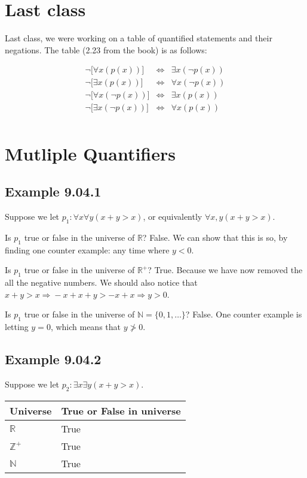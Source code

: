 \documentclass{article}
\begin{document}
\section*{Last class}

Last class, we were working on a table of quantified statements and
their negations. The table (2.23 from the book) is as follows:

\[
\begin{array}{rcl}
\neg\lbrack\forall x(p(x))\rbrack & \Leftrightarrow & \exists x(\neg p(x)) \\
\neg\lbrack\exists x(p(x))\rbrack & \Leftrightarrow & \forall x(\neg p(x)) \\
\neg\lbrack\forall x(\neg p(x))\rbrack & \Leftrightarrow & \exists x(p(x)) \\
\neg\lbrack\exists x(\neg p(x))\rbrack & \Leftrightarrow & \forall x(p(x)) \\
\end{array}
\]

\section*{Mutliple Quantifiers}

\subsection*{Example 9.04.1}

Suppose we let $p_1:\forall{}x\forall{}y(x+y>x)$, or equivalently
$\forall{}x,y(x+y>x)$.

Is $p_1$ true or false in the universe of $\mathbb{R}$? False. We can
show that this is so, by finding one counter example: any time where
$y<0$.

Is $p_1$ true or false in the universe of $\mathbb{R}^+$?
True. Because we have now removed the all the negative numbers. We
should also notice that
$x+y>x\Rightarrow{}-x+x+y>-x+x\Rightarrow{}y>0$.

Is $p_1$ true or false in the universe of $\mathbb{N}=\{0,1,\dots\}$?
False. One counter example is letting $y=0$, which means that
$y\not>0$.

\subsection*{Example 9.04.2}

Suppose we let $p_2:\exists{}x\exists{}y(x+y>x)$.

\begin{tabular}{ll}
Universe & True or False in universe \\
\hline
$\mathbb{R}$ & True \\
$\mathbb{Z}^+$ & True \\
$\mathbb{N}$ & True \\
\end{tabular}
\end{document}
